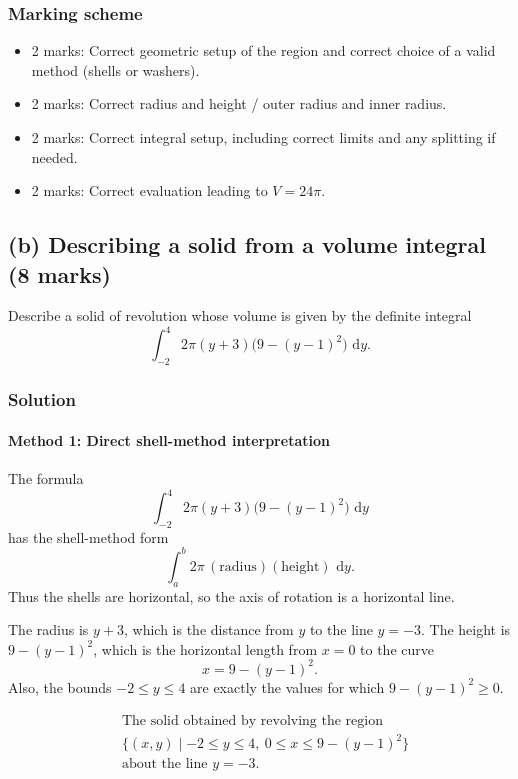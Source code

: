 \documentclass[12pt]{article}
\newcommand{\dd}{\,\mathrm{d}}
\begin{document}
\subsubsection{Marking scheme}
\begin{itemize}
\item 2 marks: Correct geometric setup of the region and correct choice of a valid method (shells or washers).
\item 2 marks: Correct radius and height / outer radius and inner radius.
\item 2 marks: Correct integral setup, including correct limits and any splitting if needed.
\item 2 marks: Correct evaluation leading to \(V=24\pi\).
\end{itemize}


\subsection{(b) Describing a solid from a volume integral \hfill (8 marks)}

Describe a solid of revolution whose volume is given by the definite integral
\[
\int_{-2}^{4} 2\pi(y+3)\bigl(9-(y-1)^2\bigr)\,\dd y.
\]

\subsubsection{Solution}

\paragraph{Method 1: Direct shell-method interpretation}
The formula
\[
\int_{-2}^{4} 2\pi(y+3)\bigl(9-(y-1)^2\bigr)\,\dd y
\]
has the shell-method form
\[
\int_a^b 2\pi\,(\text{radius})(\text{height})\,\dd y.
\]
Thus the shells are horizontal, so the axis of rotation is a horizontal line.

The radius is \(y+3\), which is the distance from \(y\) to the line \(y=-3\).
The height is \(9-(y-1)^2\), which is the horizontal length from \(x=0\) to the curve
\[
x=9-(y-1)^2.
\]
Also, the bounds \(-2\le y\le 4\) are exactly the values for which \(9-(y-1)^2\ge 0\).

\[
\boxed{
\begin{aligned}
&\text{The solid obtained by revolving the region }\\
&\{(x,y)\mid -2\le y\le 4,\ 0\le x\le 9-(y-1)^2\}\\
&\text{about the line }y=-3.
\end{aligned}
}
\]
\end{document}
